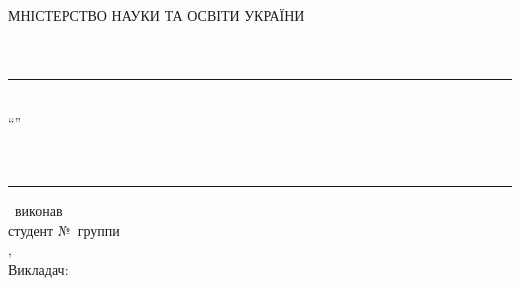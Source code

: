 \thispagestyle{empty}
{ \sffamily
\begin{center}
	\LARGE{МНІСТЕРСТВО НАУКИ ТА ОСВІТИ УКРАЇНИ}\\
	\LARGE{\university}\\
	\Large{\faculty}\\
	\Large{\department}
\end{center}
\vspace*{\fill}
\begin{center}
	\rule[-1mm]{0.3\textwidth}{0.25mm}\\
	\Large
	``\subjectname''\\
	\prodname\ \prodnumber\\
	\proddate\\
	\rule[4.5mm]{0.2\textwidth}{0.25mm}
\end{center}
\vspace*{\fill}
\begin{center}
	\large
	\prodnamef\ виконав\\
	студент №\studentnumber\ группи \shortdepartment\ \groupnumber\ \shortuniversity\\
	\studentname,\\
	Викладач: \teacher 
\end{center}
}
\newpage